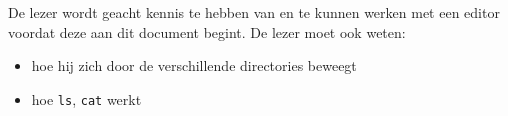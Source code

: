 De lezer wordt geacht kennis te hebben van en te kunnen werken met een editor voordat deze aan dit document begint. De lezer moet ook weten:
\begin{itemize}
\item hoe hij zich door de verschillende directories beweegt
\item hoe \texttt{ls}, \texttt{cat} werkt
\end{itemize}

